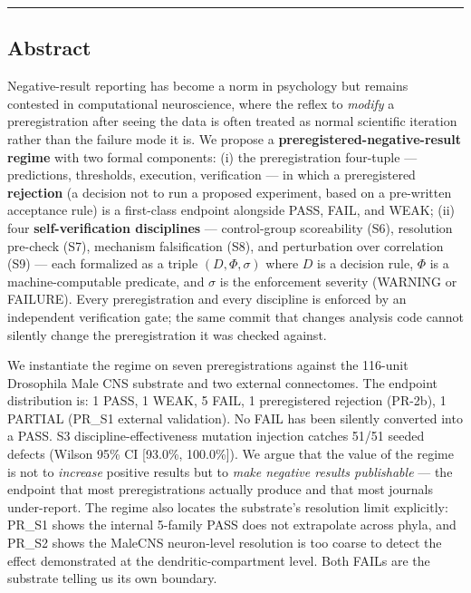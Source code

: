 \documentclass[
]{article}
\begin{document}
\begin{center}\rule{0.5\linewidth}{0.5pt}\end{center}

\subsection{Abstract}\label{abstract}

Negative-result reporting has become a norm in psychology but remains
contested in computational neuroscience, where the reflex to
\emph{modify} a preregistration after seeing the data is often treated
as normal scientific iteration rather than the failure mode it is. We
propose a \textbf{preregistered-negative-result regime} with two formal
components: (i) the preregistration four-tuple --- predictions,
thresholds, execution, verification --- in which a preregistered
\textbf{rejection} (a decision not to run a proposed experiment, based
on a pre-written acceptance rule) is a first-class endpoint alongside
PASS, FAIL, and WEAK; (ii) four \textbf{self-verification disciplines}
--- control-group scoreability (S6), resolution pre-check (S7),
mechanism falsification (S8), and perturbation over correlation (S9) ---
each formalized as a triple \((D, \Phi, \sigma)\) where \(D\) is a
decision rule, \(\Phi\) is a machine-computable predicate, and
\(\sigma\) is the enforcement severity (WARNING or FAILURE). Every
preregistration and every discipline is enforced by an independent
verification gate; the same commit that changes analysis code cannot
silently change the preregistration it was checked against.

We instantiate the regime on seven preregistrations against the 116-unit
Drosophila Male CNS substrate and two external connectomes. The endpoint
distribution is: 1 PASS, 1 WEAK, 5 FAIL, 1 preregistered rejection
(PR-2b), 1 PARTIAL (PR\_S1 external validation). No FAIL has been
silently converted into a PASS. S3 discipline-effectiveness mutation
injection catches 51/51 seeded defects (Wilson 95\% CI {[}93.0\%,
100.0\%{]}). We argue that the value of the regime is not to
\emph{increase} positive results but to \emph{make negative results
publishable} --- the endpoint that most preregistrations actually
produce and that most journals under-report. The regime also locates the
substrate's resolution limit explicitly: PR\_S1 shows the internal
5-family PASS does not extrapolate across phyla, and PR\_S2 shows the
MaleCNS neuron-level resolution is too coarse to detect the effect \citet{ref35} demonstrated at the dendritic-compartment level. Both FAILs
are the substrate telling us its own boundary.
\end{document}
